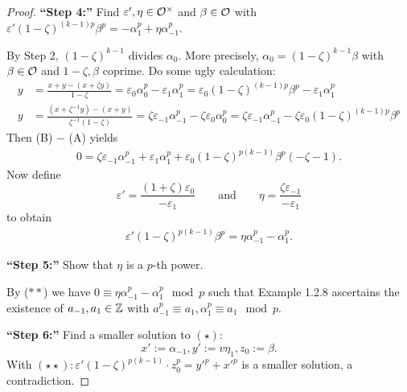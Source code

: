 \begin{proof}
	\bigskip \textbf{\enquote{Step 4:}}
	Find $\varepsilon', \eta \in \mathcal{O}^\times$ and $\beta\in\mathcal{O}$ with 
	$\varepsilon' (1-\zeta)^{(k-1)p} \beta^p = -\alpha_1^p + \eta \alpha_{-1}^p$.
	
	By Step 2, $(1-\zeta)^{k-1}$ divides $\alpha_0$. More precisely,
	$\alpha_0 = (1-\zeta)^{k-1} \beta$ with $\beta \in \mathcal{O}$ and $1-\zeta,\beta$ coprime.
	Do some ugly calculation:
	\begin{align}
	y \tag{A}
	&= \frac{x+y-(x+\zeta y)}{1-\zeta}
	= \varepsilon_0 \alpha_0^p - \varepsilon_1 \alpha_1^p
	= \varepsilon_0 (1-\zeta)^{(k-1)p} \beta^p - \varepsilon_1 \alpha_1^p \\
	y \tag{B}
	&= \frac{\left( x+ \zeta^{-1}y\right) - (x+y)}{\zeta^{-1}(1-\zeta)}
	= \zeta \varepsilon_{-1} \alpha_{-1}^p - \zeta \varepsilon_0 \alpha_0^p
	= \zeta \varepsilon_{-1} \alpha_{-1}^p - \zeta \varepsilon_0  (1-\zeta)^{(k-1)p} \beta^p
	\end{align}
	Then (B) $-$ (A) yields
	\begin{align*}
	0
	= \zeta \varepsilon_{-1} \alpha_{-1}^p +  \varepsilon_{1} \alpha_{1}^p
		+ \varepsilon_{0} (1-\zeta) ^{p(k-1)} \beta^p (-\zeta -1).
	\end{align*}
	Now define
	\[ \varepsilon' = \frac{(1+\zeta) \varepsilon_0}{-\varepsilon_1}
	\qquad \text{and} \qquad
	\eta = \frac{\zeta\varepsilon_{-1}}{-\varepsilon_1}
	\]
	to obtain 
	\begin{align} \tag{$**$}
	\varepsilon'  (1-\zeta) ^{p(k-1)} \beta^p = \eta \alpha_{-1}^p - \alpha_1^p.
	\end{align}
	
	\bigskip \textbf{\enquote{Step 5:}}
	Show that $\eta$ is a $p$-th power.
	
	By ($**$) we have $0\equiv\eta \alpha_{-1}^p - \alpha_1^p \mod p$ such that
	Example 1.2.8 ascertains the existence of $a_{-1}, a_1 \in \mathbb{Z}$ with
	$a_{-1}^p\equiv a_1, \alpha_1^p \equiv a_1 \mod p$.
	
	\bigskip \textbf{\enquote{Step 6:}} Find a smaller solution to $(\star)$:\\
	\[x':= \alpha_{-1}, y':=v\eta_1, z_0:=\beta.\]
	With $(\star\star): \varepsilon'(1-\zeta)^{p(k-1)} \cdot z_0^p=y'^p+x'^p$ is a smaller solution, a contradiction.
\end{proof}































